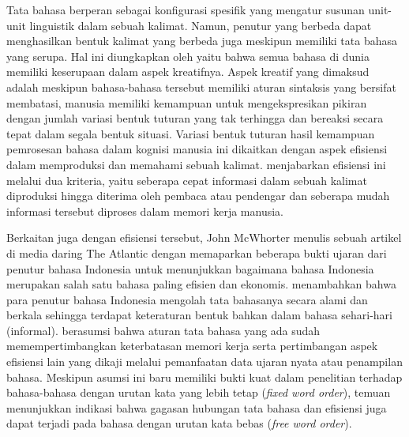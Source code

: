 Tata bahasa berperan sebagai konfigurasi spesifik yang mengatur susunan unit-unit linguistik dalam sebuah kalimat. Namun, penutur yang berbeda dapat menghasilkan bentuk kalimat yang berbeda juga meskipun memiliki tata bahasa yang serupa. Hal ini diungkapkan oleh \citet[pp. 6-8]{chomsky1965syntactic} yaitu bahwa semua bahasa di dunia memiliki keserupaan dalam aspek kreatifnya. Aspek kreatif yang dimaksud adalah meskipun bahasa-bahasa tersebut memiliki aturan sintaksis yang bersifat membatasi, manusia memiliki kemampuan untuk mengekspresikan pikiran dengan jumlah variasi bentuk tuturan yang tak terhingga dan bereaksi secara tepat dalam segala bentuk situasi. Variasi bentuk tuturan hasil kemampuan pemrosesan bahasa dalam kognisi manusia ini dikaitkan dengan aspek efisiensi dalam memproduksi dan memahami sebuah kalimat.\citet[p. 231]{hawkins2014cross} menjabarkan efisiensi ini melalui dua kriteria, yaitu seberapa cepat informasi dalam sebuah kalimat diproduksi hingga diterima oleh pembaca atau pendengar dan seberapa mudah informasi tersebut diproses dalam memori kerja manusia. 

Berkaitan juga dengan efisiensi tersebut, John McWhorter menulis sebuah artikel di media daring The Atlantic \citep{mcwhorter2016efficient} dengan memaparkan beberapa bukti ujaran dari penutur bahasa Indonesia untuk menunjukkan bagaimana bahasa Indonesia merupakan salah satu bahasa paling efisien dan ekonomis. \cite{mcwhorter2016efficient} menambahkan bahwa para penutur bahasa Indonesia mengolah tata bahasanya secara alami dan berkala sehingga terdapat keteraturan bentuk bahkan dalam bahasa sehari-hari (informal). \citet[pp. 4-6]{hawkins2014cross} berasumsi bahwa aturan tata bahasa yang ada sudah memempertimbangkan keterbatasan memori kerja serta pertimbangan aspek efisiensi lain yang dikaji melalui pemanfaatan data ujaran nyata atau penampilan bahasa. Meskipun asumsi ini baru memiliki bukti kuat dalam penelitian terhadap bahasa-bahasa dengan urutan kata yang lebih tetap (\textit{fixed word order}), temuan \cite{mcwhorter2016efficient} menunjukkan indikasi bahwa gagasan hubungan tata bahasa dan efisiensi \citep[pp. 4-6]{hawkins2014cross} juga dapat terjadi pada bahasa dengan urutan kata bebas (\textit{free word order}).


